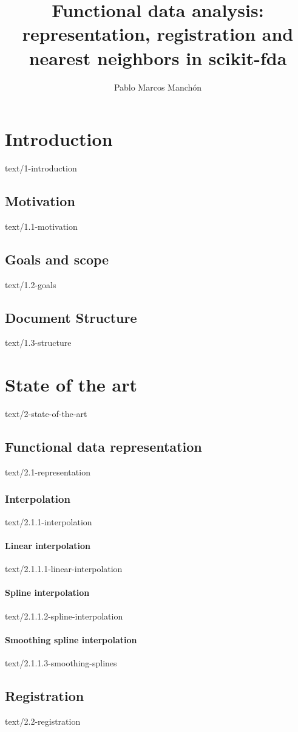 \documentclass[epsbased,copyleft,final,loe, lof,extendedindex,firstnumbered,tfg,english]{tfgtfmthesisuam}
\author{Pablo Marcos Manchón}
\title{Functional data analysis: representation, registration and nearest neighbors in scikit-fda}
\begin{document}
\chapter{Introduction\label{CAP:INTRODUCTION}}{text/1-introduction}
\section{Motivation\label{SEC:MOTIVATION}}{text/1.1-motivation}
\section{Goals and scope\label{SEC:GOALS}}{text/1.2-goals}
\section{Document Structure\label{SEC:STRUCTURE}}{text/1.3-structure}


\chapter{State of the art\label{CAP:STATEOFART}}{text/2-state-of-the-art}

\section{Functional data representation\label{SEC:REPRESENTATION}}{text/2.1-representation}
  \subsection{Interpolation\label{SEC:INTERPOLATION}}{text/2.1.1-interpolation}
    \subsubsection{Linear interpolation\label{SSEC:LINEAR}}{text/2.1.1.1-linear-interpolation}
    \subsubsection{Spline interpolation\label{SSEC:SPLINES}}{text/2.1.1.2-spline-interpolation}
    \subsubsection{Smoothing spline interpolation\label{SSEC:SSPLINES}}{text/2.1.1.3-smoothing-splines}

\section{Registration\label{SEC:REGISTRATION}}{text/2.2-registration}
\end{document}
